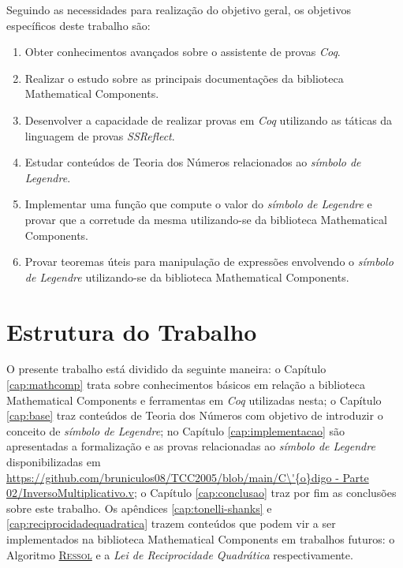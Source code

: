 Seguindo as necessidades para realização do objetivo geral, os objetivos específicos deste trabalho são:

\begin{enumerate}
    \item \label{item:obj-esp-1} Obter conhecimentos avançados sobre o assistente de provas \textit{Coq}.
    \item \label{item:obj-esp-2} Realizar o estudo sobre as principais documentações da biblioteca Mathematical Components.
    \item \label{item:obj-esp-3} Desenvolver a capacidade de realizar provas em \textit{Coq} utilizando as táticas da linguagem de provas \textit{SSReflect}.
    \item \label{item:obj-esp-4} Estudar conteúdos de Teoria dos Números relacionados ao \textit{símbolo de Legendre}.
    \item \label{obj:func} Implementar uma função que compute o valor do \textit{símbolo de Legendre} e provar que a corretude da mesma utilizando-se da biblioteca Mathematical Components.
    \item \label{obj:proofs} Provar teoremas úteis para manipulação de expressões envolvendo o \textit {símbolo de Legendre} utilizando-se da biblioteca Mathematical Components.
\end{enumerate}
 
\section{Estrutura do Trabalho}

O presente trabalho está dividido da seguinte maneira: o Capítulo \ref{cap:mathcomp} trata sobre conhecimentos básicos em relação a biblioteca Mathematical Components e ferramentas em \textit{Coq} utilizadas nesta; o Capítulo \ref{cap:base} traz conteúdos de Teoria dos Números com objetivo de introduzir o conceito de \textit{símbolo de Legendre}; no Capítulo \ref{cap:implementacao} são apresentadas a formalização e as provas relacionadas ao \textit{símbolo de Legendre} disponibilizadas em \url{https://github.com/bruniculos08/TCC2005/blob/main/C\'{o}digo - Parte 02/InversoMultiplicativo.v}; o Capítulo \ref{cap:conclusao} traz por fim as conclusões sobre este trabalho. Os apêndices \ref{cap:tonelli-shanks} e \ref{cap:reciprocidadequadratica} trazem conteúdos que podem vir a ser implementados na biblioteca Mathematical Components em trabalhos futuros: o Algoritmo \hyperref[algo:ressol]{\textsc{Ressol}} e a \textit{Lei de Reciprocidade Quadrática} respectivamente.

